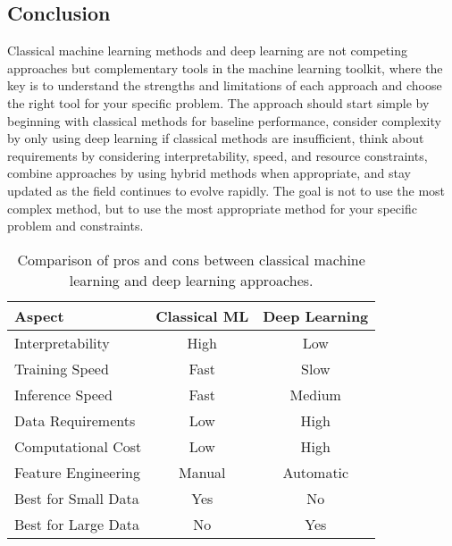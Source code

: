 \subsection{Conclusion}

Classical machine learning methods and deep learning are not competing approaches but complementary tools in the machine learning toolkit, where the key is to understand the strengths and limitations of each approach and choose the right tool for your specific problem. The approach should start simple by beginning with classical methods for baseline performance, consider complexity by only using deep learning if classical methods are insufficient, think about requirements by considering interpretability, speed, and resource constraints, combine approaches by using hybrid methods when appropriate, and stay updated as the field continues to evolve rapidly. The goal is not to use the most complex method, but to use the most appropriate method for your specific problem and constraints.

\begin{table}[htbp]
\centering
\begin{tabular}{lcc}
\toprule
Aspect & Classical ML & Deep Learning \\
\midrule
Interpretability & High & Low \\
Training Speed & Fast & Slow \\
Inference Speed & Fast & Medium \\
Data Requirements & Low & High \\
Computational Cost & Low & High \\
Feature Engineering & Manual & Automatic \\
Best for Small Data & Yes & No \\
Best for Large Data & No & Yes \\
\bottomrule
\end{tabular}
\caption{Comparison of pros and cons between classical machine learning and deep learning approaches.}
\label{tab:ml-dl-pros-cons}
\end{table}
